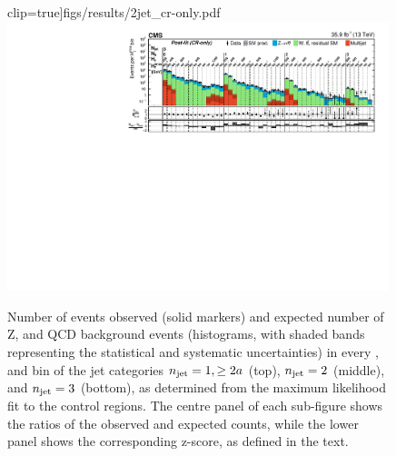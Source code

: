\begin{figure}[!p]
clip=true]{figs/results/2jet_cr-only.pdf}\\
\includegraphics[width=0.99\textwidth, trim=0 0 0 0, 
clip=true]{figs/results/3jet_cr-only.pdf}\\
\caption{Number of events observed (solid markers) and expected number of Z, 
\ttw and QCD background events (histograms, with shaded bands representing the 
statistical and systematic uncertainties) in every \nb, \scalht and \mht bin of 
the jet categories $n_{\text{jet}} = 1, \ge2a$ (top), $n_{\text{jet}}=2$ (middle), and $n_{\text{jet}}=3$ 
(bottom), as determined from the maximum likelihood fit to the control regions. 
The centre panel of each sub-figure shows the ratios of the observed and 
expected counts, while the lower panel shows the corresponding z-score, as 
defined in the text.}
\label{fig:results1}
\end{figure}

